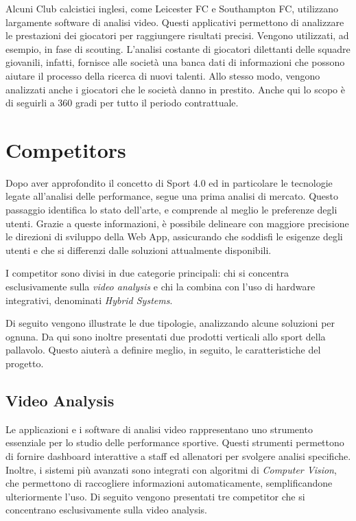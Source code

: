 Alcuni Club calcistici inglesi, come Leicester FC e Southampton FC, utilizzano largamente software di analisi video. Questi applicativi permettono di analizzare le prestazioni dei giocatori per raggiungere risultati precisi. Vengono utilizzati, ad esempio, in fase di scouting. L'analisi costante di giocatori dilettanti delle squadre giovanili, infatti, fornisce alle società una banca dati di informazioni che possono aiutare il processo della ricerca di nuovi talenti. Allo stesso modo, vengono analizzati anche i giocatori che le società danno in prestito. Anche qui lo scopo è di seguirli a 360 gradi per tutto il periodo contrattuale.



\vspace{\baselineskip}
\section{Competitors}
\label{sec:competitor}

Dopo aver approfondito il concetto di Sport 4.0 ed in particolare le tecnologie legate all'analisi delle performance, segue una prima analisi di mercato. Questo passaggio identifica lo stato dell'arte, e comprende al meglio le preferenze degli utenti. Grazie a queste informazioni, è possibile delineare con maggiore precisione le direzioni di sviluppo della Web App, assicurando che soddisfi le esigenze degli utenti e che si differenzi dalle soluzioni attualmente disponibili.

I competitor sono divisi in due categorie principali: chi si concentra esclusivamente sulla \textit{video analysis} e chi la combina con l'uso di hardware integrativi, denominati \textit{Hybrid Systems}.





\noindent Di seguito vengono illustrate le due tipologie, analizzando alcune soluzioni per ognuna. Da qui sono inoltre presentati due prodotti verticali allo sport della pallavolo. Questo aiuterà a definire meglio, in seguito, le caratteristiche del progetto. 
\pagebreak


\subsection{Video Analysis}
Le applicazioni e i software di analisi video rappresentano uno strumento essenziale per lo studio delle performance sportive. Questi strumenti permettono di fornire dashboard interattive a staff ed allenatori per svolgere analisi specifiche. Inoltre, i sistemi più avanzati sono integrati con algoritmi di \textit{Computer Vision}, che permettono di raccogliere informazioni automaticamente, semplificandone ulteriormente l'uso. 
\noindent Di seguito vengono presentati tre competitor che si concentrano esclusivamente sulla video analysis.


